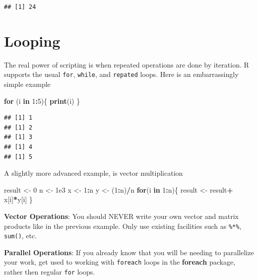 \documentclass[]{book}
\newenvironment{Shaded}{\begin{snugshade}}{\end{snugshade}}
\newcommand{\KeywordTok}[1]{\textcolor[rgb]{0.13,0.29,0.53}{\textbf{#1}}}
\newcommand{\DecValTok}[1]{\textcolor[rgb]{0.00,0.00,0.81}{#1}}
\newcommand{\FloatTok}[1]{\textcolor[rgb]{0.00,0.00,0.81}{#1}}
\newcommand{\StringTok}[1]{\textcolor[rgb]{0.31,0.60,0.02}{#1}}
\newcommand{\ControlFlowTok}[1]{\textcolor[rgb]{0.13,0.29,0.53}{\textbf{#1}}}
\newcommand{\OperatorTok}[1]{\textcolor[rgb]{0.81,0.36,0.00}{\textbf{#1}}}
\newcommand{\NormalTok}[1]{#1}
\theoremstyle{definition}
\theoremstyle{definition}
\theoremstyle{definition}
\theoremstyle{remark}
\let\BeginKnitrBlock\begin \let\EndKnitrBlock\end
\begin{document}
\begin{verbatim}
## [1] 24
\end{verbatim}

\section{Looping}\label{looping}

The real power of scripting is when repeated operations are done by
iteration. R supports the usual \texttt{for}, \texttt{while}, and
\texttt{repated} loops. Here is an embarrassingly simple example

\begin{Shaded}
\begin{Highlighting}[]
\ControlFlowTok{for}\NormalTok{ (i }\ControlFlowTok{in} \DecValTok{1}\OperatorTok{:}\DecValTok{5}\NormalTok{)\{}
    \KeywordTok{print}\NormalTok{(i)}
\NormalTok{    \}}
\end{Highlighting}
\end{Shaded}

\begin{verbatim}
## [1] 1
## [1] 2
## [1] 3
## [1] 4
## [1] 5
\end{verbatim}

A slightly more advanced example, is vector multiplication

\begin{Shaded}
\begin{Highlighting}[]
\NormalTok{result <-}\StringTok{ }\DecValTok{0}
\NormalTok{n <-}\StringTok{ }\FloatTok{1e3}
\NormalTok{x <-}\StringTok{ }\DecValTok{1}\OperatorTok{:}\NormalTok{n}
\NormalTok{y <-}\StringTok{ }\NormalTok{(}\DecValTok{1}\OperatorTok{:}\NormalTok{n)}\OperatorTok{/}\NormalTok{n}
\ControlFlowTok{for}\NormalTok{(i }\ControlFlowTok{in} \DecValTok{1}\OperatorTok{:}\NormalTok{n)\{}
\NormalTok{  result <-}\StringTok{ }\NormalTok{result}\OperatorTok{+}\StringTok{ }\NormalTok{x[i]}\OperatorTok{*}\NormalTok{y[i]}
\NormalTok{\}}
\end{Highlighting}
\end{Shaded}

\BeginKnitrBlock{remark}
{}\textbf{Vector Operations}: You should NEVER
write your own vector and matrix products like in the previous example.
Only use existing facilities such as \texttt{\%*\%}, \texttt{sum()},
etc.
\EndKnitrBlock{remark}

\BeginKnitrBlock{remark}
{}\textbf{Parallel Operations}: If you already
know that you will be needing to parallelize your work, get used to
working with \texttt{foreach} loops in the \textbf{foreach} package,
rather then regular \texttt{for} loops.
\EndKnitrBlock{remark}
\end{document}
